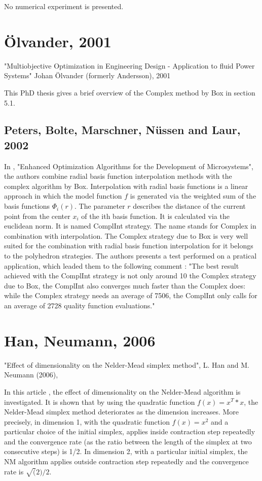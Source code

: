 No numerical experiment is presented.

\section{Ölvander, 2001}

"Multiobjective Optimization in Engineering Design - Application to fluid Power Systems"
Johan Ölvander (formerly Andersson), 2001

This PhD thesis \cite{Andersson01multiobjectiveoptimization} gives a brief overview of the Complex method by Box in 
section 5.1.

\subsection{Peters, Bolte, Marschner, N\"{u}ssen and Laur, 2002}

In \cite{590075}, "Enhanced Optimization Algorithms for the Development of Microsystems", 
the authors combine radial basis function interpolation methods 
with the complex algorithm by Box.
Interpolation with radial basis functions is a linear approach
in which the model function $f$ is generated
via the weighted sum of the basis functions $\Phi_i(r)$.
The parameter $r$ describes the distance of the current
point from the center $x_i$ of the ith basis function. It is
calculated via the euclidean norm.
It is named ComplInt strategy. The name stands for
Complex in combination with interpolation. The Complex
strategy due to Box is very well suited for the
combination with radial basis function interpolation
for it belongs to the polyhedron strategies.
The authors presents a test performed on a pratical application, 
which leaded them to the following comment :
"The best result achieved with the ComplInt strategy
is not only around 10%
the Complex strategy due to Box, the ComplInt also
converges much faster than the Complex does: while
the Complex strategy needs an average of 7506, the
ComplInt only calls for an average of 2728 quality
function evaluations."


\section{Han, Neumann, 2006}

"Effect of dimensionality on the Nelder-Mead simplex method", 
L. Han and M. Neumann (2006), 


In this article \cite{HanNeumann2006}, the effect of dimensionality on the Nelder-Mead algorithm is 
investigated. It is shown that by using the quadratic function $f(x) = x^T*x$, 
the Nelder-Mead simplex method deteriorates as the dimension 
increases. More precisely, in dimension 1, with the quadratic function
$f(x) = x^2$ and a particular choice of the initial simplex, applies 
inside contraction step repeatedly and the convergence rate (as the 
ratio between the length of the simplex at two consecutive steps) is 1/2. 
In dimension 2, with a particular initial simplex, the NM algorithm 
applies outside contraction step repeatedly and the convergence rate is 
$\sqrt(2)/2$.

